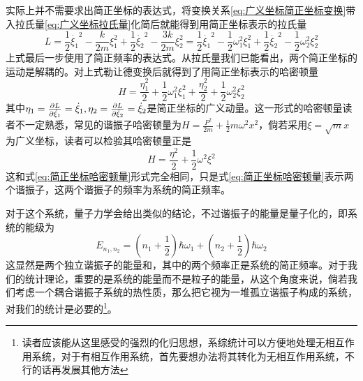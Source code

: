 \documentclass[../../main.tex]{subfiles}
\begin{document}
实际上并不需要求出简正坐标的表达式，将变换关系\eqref{eq:广义坐标简正坐标变换}带入拉氏量\eqref{eq:广义坐标拉氏量}化简后就能得到用简正坐标表示的拉氏量
\begin{equation}
    L=\frac{1}{2}\dot{\xi_1}^2-\frac{k}{2m}\xi_1^2+\frac{1}{2}\dot{\xi_2}^2-\frac{3k}{2m}\xi_2^2=\frac{1}{2}\dot{\xi_1}^2-\frac{1}{2}\omega_1^2\xi_1^2+\frac{1}{2}\dot{\xi_2}^2-\frac{1}{2}\omega_2^2\xi_2^2
\end{equation}
上式最后一步使用了简正频率的表达式。从拉氏量我们已能看出，两个简正坐标的运动是解耦的。对上式勒让德变换后就得到了用简正坐标表示的哈密顿量
\begin{equation}\label{eq:简正坐标哈密顿量}
    H=\frac{\eta_1^2}{2}+\frac{1}{2}\omega_1^2\xi_1^2+\frac{\eta_2^2}{2}+\frac{1}{2}\omega_2^2\xi_2^2
\end{equation}
其中\(\eta_1=\pdv{L}{\dot{\xi}_1}=\dot{\xi}_1,\eta_2=\pdv{L}{\dot{\xi}_2}=\dot{\xi}_2\)是简正坐标的广义动量。这一形式的哈密顿量读者不一定熟悉，常见的谐振子哈密顿量为\(H=\frac{P^2}{2m}+\frac{1}{2}m\omega^2x^2\)，倘若采用\(\xi=\sqrt{m}x\)为广义坐标，读者可以检验其哈密顿量正是
\begin{equation}
    H=\frac{\eta^2}{2}+\frac{1}{2}\omega^2\xi^2
\end{equation}
这和式\eqref{eq:简正坐标哈密顿量}形式完全相同，只是式\eqref{eq:简正坐标哈密顿量}表示两个谐振子，这两个谐振子的频率为系统的简正频率。

对于这个系统，量子力学会给出类似的结论，不过谐振子的能量是量子化的，即系统的能级为
\begin{equation}
    E_{n_1,n_2}=\left(n_1+\frac{1}{2}\right)\hbar\omega_1+\left(n_2+\frac{1}{2}\right)\hbar\omega_2
\end{equation}
这显然是两个独立谐振子的能量和，其中的两个频率正是系统的简正频率。对于我们的统计理论，重要的是系统的能量而不是粒子的能量，从这个角度来说，倘若我们考虑一个耦合谐振子系统的热性质，那么把它视为一堆孤立谐振子构成的系统，对我们的统计是必要的\footnote{读者应该能从这里感受的强烈的化归思想，系综统计可以方便地处理无相互作用系统，对于有相互作用系统，首先要想办法将其转化为无相互作用系统，不行的话再发展其他方法}。
\end{document}
